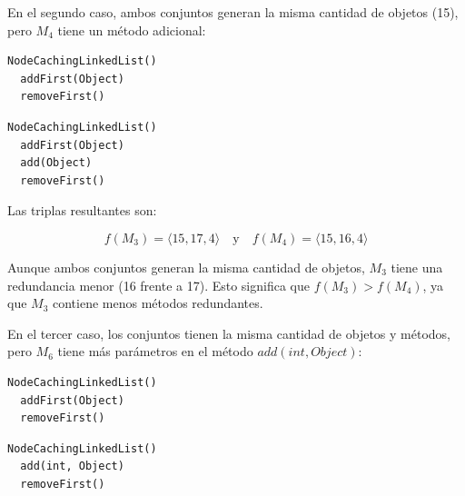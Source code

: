 En el segundo caso, ambos conjuntos generan la misma cantidad de objetos (15), pero \( M_4 \) tiene un método adicional:
\vspace{10pt} 

\begin{lstlisting}[numbers=none,label=fig:NCLbuilders3, caption=Conjunto de métodos \( M_3 \)]
  NodeCachingLinkedList()
  addFirst(Object)
  removeFirst()
\end{lstlisting}

\vspace{10pt} 

\begin{lstlisting}[numbers=none,label=fig:NCLbuilders4, caption=Conjunto de métodos \( M_4 \)]
  NodeCachingLinkedList()
  addFirst(Object)
  add(Object)
  removeFirst()
\end{lstlisting}


Las triplas resultantes son:

\[
f(M_3) = \langle 15, 17, 4 \rangle \quad \text{y} \quad f(M_4) = \langle 15, 16, 4 \rangle
\]

Aunque ambos conjuntos generan la misma cantidad de objetos, \( M_3 \) tiene una redundancia menor (16 frente a 17). Esto significa que \( f(M_3) > f(M_4) \), ya que \( M_3 \) contiene menos métodos redundantes.

En el tercer caso, los conjuntos tienen la misma cantidad de objetos y métodos, pero \( M_6 \) tiene más parámetros en el método \( add(int, Object) \):
\vspace{10pt} 

\begin{lstlisting}[numbers=none,label=fig:NCLbuilders5, caption=Conjunto de métodos \( M_5 \)]
  NodeCachingLinkedList()
  addFirst(Object)
  removeFirst()
\end{lstlisting}

\vspace{10pt} 

\begin{lstlisting}[numbers=none,label=fig:NCLbuilders6, caption=Conjunto de métodos \( M_6 \)]
  NodeCachingLinkedList()
  add(int, Object)
  removeFirst()
\end{lstlisting}

\vspace{10pt} 


